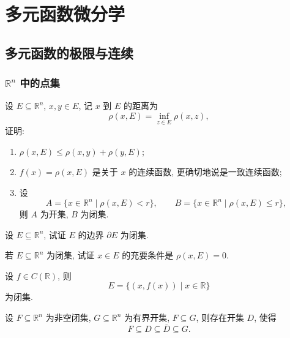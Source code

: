 \documentclass[../数学分析培优讲义.tex]{subfiles}
\begin{document}
\setcounter{chapter}{9}
\pagestyle{fancy}

\chapter{多元函数微分学}


\section{多元函数的极限与连续}


\subsection{\texorpdfstring{$\mathbb{R}^n$}{Rⁿ} 中的点集}

\begin{example}[\markstar]
设 $E\subseteq\mathbb{R}^n$, $x,y\in E$, 记 $x$ 到 $E$ 的距离为
\[
    \rho(x,E)=\inf_{z\in E}\rho(x,z),
\]
证明:
\begin{enumerate}[label=(\arabic*)]
    \item $\rho(x,E)\leq\rho(x,y)+\rho(y,E)$;
    \item $f(x)=\rho(x,E)$ 是关于 $x$ 的连续函数, 更确切地说是一致连续函数;
    \item 设
    \[
        A=\{x\in\mathbb{R}^n\mid \rho(x,E)<r\},\qquad
        B=\{x\in\mathbb{R}^n\mid \rho(x,E)\leq r\},
    \]
    则 $A$ 为开集, $B$ 为闭集.
\end{enumerate}
\end{example}
\exampleblank

\begin{example}
设 $E\subseteq\mathbb{R}^n$, 试证 $E$ 的边界 $\partial E$ 为闭集.
\end{example}
\exampleblank

\begin{example}
若 $E\subseteq\mathbb{R}^n$ 为闭集, 试证 $x\in E$ 的充要条件是 $\rho(x,E)=0$.
\end{example}
\exampleblank

\begin{example}
设 $f\in C(\mathbb{R})$, 则
\[
    E=\{(x,f(x))\mid x\in\mathbb{R}\}
\]
为闭集.
\end{example}
\exampleblank

\begin{example}
设 $F\subseteq\mathbb{R}^n$ 为非空闭集, $G\subseteq\mathbb{R}^n$ 为有界开集, $F\subseteq G$, 则存在开集 $D$, 使得
\[
    F\subseteq D\subseteq\overline D\subseteq G.
\]
\end{example}
\exampleblank
\end{document}
